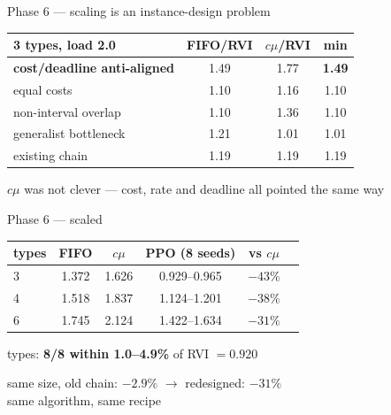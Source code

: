 \documentclass[12pt,aspectratio=169]{beamer}
\newcommand{\good}[1]{\textbf{#1}}
\begin{document}
\begin{frame}{Phase 6 --- scaling is an instance-design problem}

\begin{center}
\large
\begin{tabular}{lccc}
\toprule
3 types, load 2.0 & FIFO/RVI & $c\mu$/RVI & min \\
\midrule
\good{cost/deadline anti-aligned} & 1.49 & 1.77 & \good{1.49} \\
equal costs                       & 1.10 & 1.16 & 1.10 \\
non-interval overlap              & 1.10 & 1.36 & 1.10 \\
generalist bottleneck             & 1.21 & 1.01 & 1.01 \\
\midrule
existing chain                    & 1.19 & 1.19 & 1.19 \\
\bottomrule
\end{tabular}
\end{center}

\vfill
\centering
$c\mu$ was not clever --- cost, rate and deadline all pointed the same way

\end{frame}

\begin{frame}{Phase 6 --- scaled}

\begin{center}
\large
\begin{tabular}{lccccc}
\toprule
types & FIFO & $c\mu$ & PPO (8 seeds) & vs $c\mu$ \\
\midrule
3 & 1.372 & 1.626 & 0.929--0.965 & \good{$-43\%$} \\
4 & 1.518 & 1.837 & 1.124--1.201 & $-38\%$ \\
6 & 1.745 & 2.124 & 1.422--1.634 & $-31\%$ \\
\bottomrule
\end{tabular}
\end{center}

\vfill
{} types: \good{8/8 within 1.0--4.9\%} of RVI $= 0.920$

\vfill
\begin{block}{}
\centering
same size, old chain: \good{$-2.9\%$} \quad $\longrightarrow$ \quad redesigned: \good{$-31\%$} \\[2pt]
\small same algorithm, same recipe
\end{block}

\end{frame}
\end{document}
